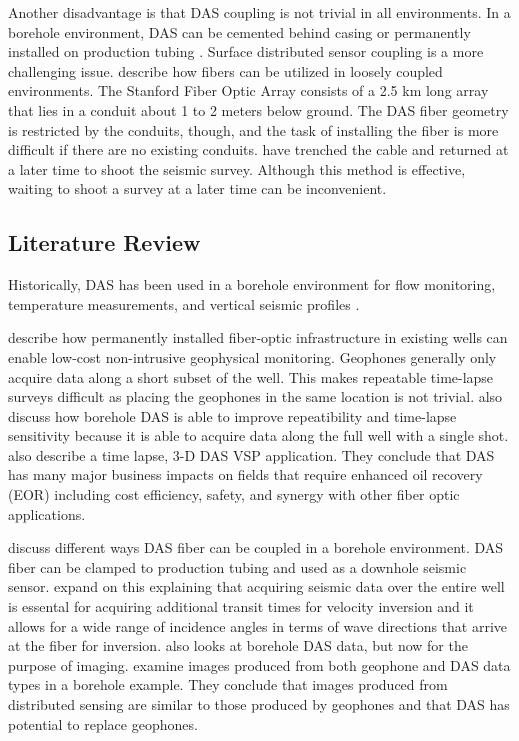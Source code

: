 Another disadvantage is that DAS coupling is not trivial in all environments. In a borehole environment, DAS can be cemented behind casing or permanently installed on production tubing \citep{mateeva2013distributed}. Surface distributed sensor coupling is a more challenging issue. \citet{lindsey2017fiber} describe how fibers can be utilized in loosely coupled environments. The Stanford Fiber Optic Array consists of a 2.5 km long array that lies in a conduit about 1 to 2 meters below ground. The DAS fiber geometry is restricted by the conduits, though, and the task of installing the fiber is more difficult if there are no existing conduits. \citet{daley2013field} have trenched the cable and returned at a later time to shoot the seismic survey. Although this method is effective, waiting to shoot a survey at a later time can be inconvenient.

\subsection{Literature Review}
Historically, DAS has been used in a borehole environment for flow monitoring, temperature measurements, and vertical seismic profiles \citep{clarke1983fiber, krohn2000fiber,mestayer2011field, barberan2012multi, cox2012distributed, daley2013field, mateeva2014distributed}.

\citet{mestayer2011field} describe how permanently installed fiber-optic infrastructure in existing wells can enable low-cost non-intrusive geophysical monitoring. Geophones generally only acquire data along a short subset of the well. This makes repeatable time-lapse surveys difficult as placing the geophones in the same location is not trivial. \citet{mestayer2011field} also discuss how borehole DAS is able to improve repeatibility and time-lapse sensitivity because it is able to acquire data along the full well with a single shot.  \citet{mateeva2014distributed} also describe a time lapse, 3-D DAS VSP application. They conclude that DAS has many major business impacts on fields that require enhanced oil recovery (EOR) including cost efficiency, safety, and synergy with other fiber optic applications.

\citet{barberan2012multi} discuss different ways DAS fiber can be coupled in a borehole environment. DAS fiber can be clamped to production tubing and used as a downhole seismic sensor. \citet{barberan2012multi} expand on this explaining that acquiring seismic data over the entire well is essental for acquiring additional transit times for velocity inversion and it allows for a wide range of incidence angles in terms of wave directions that arrive at the fiber for inversion. \citet{cox2012distributed} also looks at borehole DAS data, but now for the purpose of imaging. \citet{cox2012distributed} examine images produced from both geophone and DAS data types in a borehole example. They conclude that images produced from distributed sensing are similar to those produced by geophones and that DAS has potential to replace geophones.

